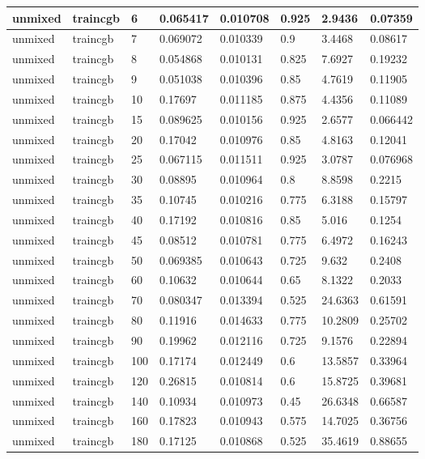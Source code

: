 \begin{longtable}{llllllll}
unmixed & traincgb & 6 & 0.065417 & 0.010708 & 0.925 & 2.9436 & 0.07359 \\ \hline 
unmixed & traincgb & 7 & 0.069072 & 0.010339 & 0.9 & 3.4468 & 0.08617 \\ \hline 
unmixed & traincgb & 8 & 0.054868 & 0.010131 & 0.825 & 7.6927 & 0.19232 \\ \hline 
unmixed & traincgb & 9 & 0.051038 & 0.010396 & 0.85 & 4.7619 & 0.11905 \\ \hline 
unmixed & traincgb & 10 & 0.17697 & 0.011185 & 0.875 & 4.4356 & 0.11089 \\ \hline 
unmixed & traincgb & 15 & 0.089625 & 0.010156 & 0.925 & 2.6577 & 0.066442 \\ \hline 
unmixed & traincgb & 20 & 0.17042 & 0.010976 & 0.85 & 4.8163 & 0.12041 \\ \hline 
unmixed & traincgb & 25 & 0.067115 & 0.011511 & 0.925 & 3.0787 & 0.076968 \\ \hline 
unmixed & traincgb & 30 & 0.08895 & 0.010964 & 0.8 & 8.8598 & 0.2215 \\ \hline 
unmixed & traincgb & 35 & 0.10745 & 0.010216 & 0.775 & 6.3188 & 0.15797 \\ \hline 
unmixed & traincgb & 40 & 0.17192 & 0.010816 & 0.85 & 5.016 & 0.1254 \\ \hline 
unmixed & traincgb & 45 & 0.08512 & 0.010781 & 0.775 & 6.4972 & 0.16243 \\ \hline 
unmixed & traincgb & 50 & 0.069385 & 0.010643 & 0.725 & 9.632 & 0.2408 \\ \hline 
unmixed & traincgb & 60 & 0.10632 & 0.010644 & 0.65 & 8.1322 & 0.2033 \\ \hline 
unmixed & traincgb & 70 & 0.080347 & 0.013394 & 0.525 & 24.6363 & 0.61591 \\ \hline 
unmixed & traincgb & 80 & 0.11916 & 0.014633 & 0.775 & 10.2809 & 0.25702 \\ \hline 
unmixed & traincgb & 90 & 0.19962 & 0.012116 & 0.725 & 9.1576 & 0.22894 \\ \hline 
unmixed & traincgb & 100 & 0.17174 & 0.012449 & 0.6 & 13.5857 & 0.33964 \\ \hline 
unmixed & traincgb & 120 & 0.26815 & 0.010814 & 0.6 & 15.8725 & 0.39681 \\ \hline 
unmixed & traincgb & 140 & 0.10934 & 0.010973 & 0.45 & 26.6348 & 0.66587 \\ \hline 
unmixed & traincgb & 160 & 0.17823 & 0.010943 & 0.575 & 14.7025 & 0.36756 \\ \hline 
unmixed & traincgb & 180 & 0.17125 & 0.010868 & 0.525 & 35.4619 & 0.88655 \\ \hline 

\end{longtable}
